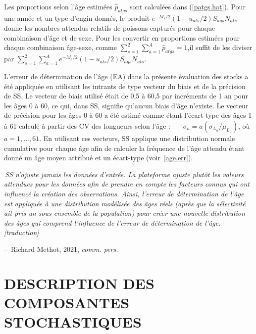 \documentclass[11pt]{book}
\makeatletter
\newcommand{\angL}{\guillemotleft\,}
\newcommand{\angR}{\,\guillemotright}
\newenvironment{chapquote}[2][2em]
  {\setlength{\@tempdima}{#1}%
   \def\chapquote@author{#2}%
   \parshape 1 \@tempdima \dimexpr\textwidth-2\@tempdima\relax%
   \itshape}
  {\par\normalfont\hfill--\ \chapquote@author\hspace*{\@tempdima}\par\smallskip}
\newcommand{\eref}[1]{(\ref{#1})}
\makeatother
\begin{document}
Les proportions selon l'\^{a}ge estim\'{e}es $\widehat{p}_{atgs}$ sont calcul\'{e}es dans \eref{patgs.hat}.
Pour une ann\'{e}e et un type d'engin donn\'{e}s, le produit $e^{-M_{s}/2} (1 - u_{ats}/2) S_{ags} N_{ats}$ donne les nombres attendus relatifs de poissons captur\'{e}s pour chaque combinaison d'\^{a}ge et de sexe.
Pour les convertir en proportions estim\'{e}es pour chaque combinaison \^{a}ge-sexe, comme $\sum_{s=1}^2 \sum_{a=1}^{A} \widehat{p}_{atgs} = 1$,il suffit de les diviser par $\sum_{s=1}^2 \sum_{a=1}^A e^{-M_{s}/2} (1 - u_{ats}/2) S_{ags} N_{ats}$.

L'erreur de d\'{e}termination de l'\^{a}ge (EA) dans la pr\'{e}sente \'{e}valuation des stocks a \'{e}t\'{e} appliqu\'{e}e en utilisant les intrants de type vecteur du biais et de la pr\'{e}cision de SS.
Le vecteur de biais utilis\'{e} \'{e}tait de 0,5 \`{a} 60,5 par incr\'{e}ments de 1 an pour les \^{a}ges 0 \`{a} 60, ce qui, dans SS, signifie qu'aucun biais d'\^{a}ge n'existe.
Le vecteur de pr\'{e}cision pour les \^{a}ges 0 \`{a} 60 a \'{e}t\'{e} estim\'{e} comme \'{e}tant l'\'{e}cart-type des \^{a}ges 1 \`{a} 61 calcul\'{e} \`{a} partir des CV des longueurs selon l'\^{a}ge :
~~~$\sigma_a = a (\sigma_{L_a} / \mu_{L_a})$, o\`{u} $a = 1,...,61$.
En utilisant ces vecteurs, SS applique une distribution normale cumulative pour chaque \^{a}ge afin de calculer la fr\'{e}quence de l'\^{a}ge attendu \'{e}tant donn\'{e} un \^{a}ge moyen attribu\'{e} et un \'{e}cart-type (voir~\ref{age.err}).

\begin{chapquote}{Richard Methot, 2021, \textit{comm. pers.}}
\angL SS n'ajuste jamais les donn\'{e}es d'entr\'{e}e. La plateforme ajuste plut\^{o}t les valeurs attendues pour les donn\'{e}es afin de prendre en compte les facteurs connus qui ont influenc\'{e} la cr\'{e}ation des observations. Ainsi, l'erreur de d\'{e}termination de l'\^{a}ge est appliqu\'{e}e \`{a} une distribution mod\'{e}lis\'{e}e des \^{a}ges r\'{e}els (apr\`{e}s que la s\'{e}lectivit\'{e} ait pris un sous-ensemble de la population) pour cr\'{e}er une nouvelle distribution des \^{a}ges qui comprend l'influence de l'erreur de d\'{e}termination de l'\^{a}ge.\angR{} [traduction]
\end{chapquote}

\section{DESCRIPTION DES COMPOSANTES STOCHASTIQUES}
\end{document}
